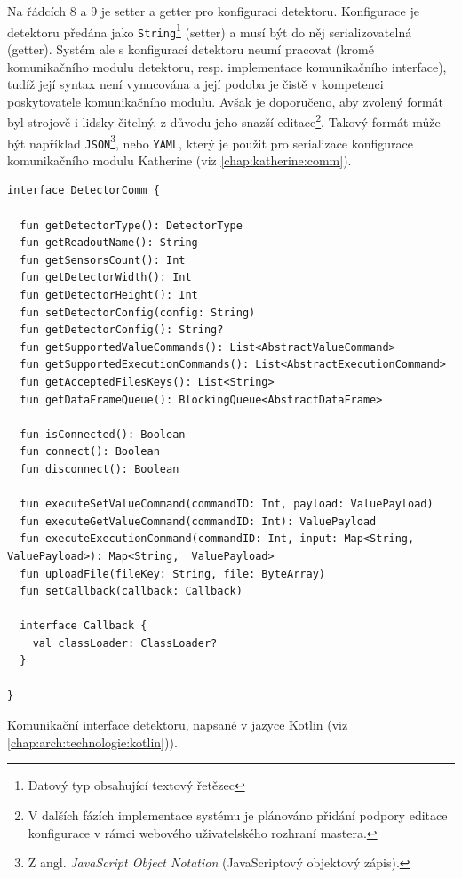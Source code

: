 Na řádcích 8 a 9 je setter a getter pro konfiguraci detektoru. Konfigurace je detektoru předána jako \texttt{String}\footnote{Datový typ obsahující textový řetězec} (setter) a musí být do něj serializovatelná (getter). Systém ale s konfigurací detektoru neumí pracovat (kromě komunikačního modulu detektoru, resp. implementace komunikačního interface), tudíž její syntax není vynucována a její podoba je čistě v kompetenci poskytovatele komunikačního modulu. Avšak je doporučeno, aby zvolený formát byl strojově i lidsky čitelný, z důvodu jeho snazší editace\footnote{V dalších fázích implementace systému je plánováno přidání podpory editace konfigurace v rámci webového uživatelského rozhraní mastera.}. Takový formát může být například \texttt{JSON}\footnote{Z angl. \textit{JavaScript Object Notation} (JavaScriptový objektový zápis).}, nebo \texttt{YAML}, který je použit pro serializace konfigurace komunikačního modulu Katherine (viz \ref{chap:katherine:comm}).

\begin{code}[h!]
\begin{verbatim}
interface DetectorComm {

  fun getDetectorType(): DetectorType
  fun getReadoutName(): String
  fun getSensorsCount(): Int
  fun getDetectorWidth(): Int
  fun getDetectorHeight(): Int
  fun setDetectorConfig(config: String)
  fun getDetectorConfig(): String?
  fun getSupportedValueCommands(): List<AbstractValueCommand>
  fun getSupportedExecutionCommands(): List<AbstractExecutionCommand>
  fun getAcceptedFilesKeys(): List<String>
  fun getDataFrameQueue(): BlockingQueue<AbstractDataFrame>
  
  fun isConnected(): Boolean
  fun connect(): Boolean
  fun disconnect(): Boolean
  
  fun executeSetValueCommand(commandID: Int, payload: ValuePayload)
  fun executeGetValueCommand(commandID: Int): ValuePayload
  fun executeExecutionCommand(commandID: Int, input: Map<String, ValuePayload>): Map<String,  ValuePayload>
  fun uploadFile(fileKey: String, file: ByteArray)
  fun setCallback(callback: Callback)
  
  interface Callback {
    val classLoader: ClassLoader?
  }

}
\end{verbatim}
\caption{Komunikační interface detektoru, napsané v jazyce Kotlin (viz \ref{chap:arch:technologie:kotlin})).}
\label{src:handler:comm_intf}
\end{code}

